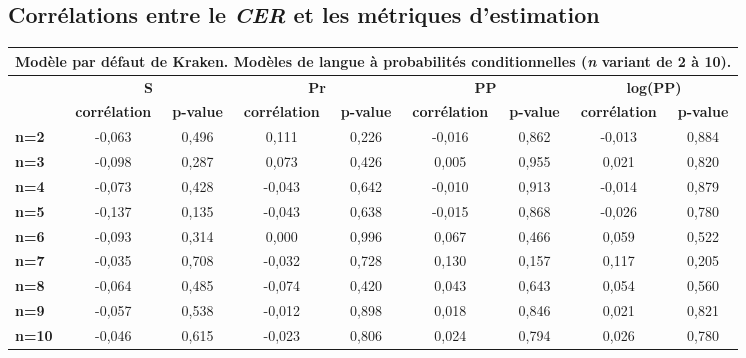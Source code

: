 \documentclass[10pt,twoside]{article}
\begin{document}
    \subsection{Corrélations entre le \textit{CER} et les métriques d'estimation}
    \begin{table}
    \begin{center}
    \begin{scriptsize}
    
    \begin{tabular}{|l|c|c|c|c|c|c|c|c|}  

    \multicolumn{9}{c}{{\footnotesize Modèle par défaut de Kraken. Modèles de langue à probabilités conditionnelles (\textit{n} variant de 2 à 10).}}\\\hline
    \multirow{2}{*}{\textbf{}} & \multicolumn{2}{c|}{\textbf{S}}         & \multicolumn{2}{c|}{\textbf{Pr}}        & \multicolumn{2}{c|}{\textbf{PP}}        & \multicolumn{2}{c|}{\textbf{log(PP)}}   \\ 
    \cline{2-9} & \textbf{corrélation} & \textbf{p-value} & \textbf{corrélation} & \textbf{p-value} & \textbf{corrélation} & \textbf{p-value} & \textbf{corrélation} & \textbf{p-value} \\ \hline
    
    \textbf{n=2}  & -0,063 & 0,496 & 0,111  & 0,226 & -0,016 & 0,862 & -0,013 & 0,884 \\ \hline
    \textbf{n=3}  & -0,098 & 0,287 & 0,073  & 0,426 & 0,005  & 0,955 & 0,021  & 0,820 \\ \hline
    \textbf{n=4}  & -0,073 & 0,428 & -0,043 & 0,642 & -0,010 & 0,913 & -0,014 & 0,879 \\ \hline
    \textbf{n=5}  & -0,137 & 0,135 & -0,043 & 0,638 & -0,015 & 0,868 & -0,026 & 0,780 \\ \hline
    \textbf{n=6}  & -0,093 & 0,314 & 0,000  & 0,996 & 0,067  & 0,466 & 0,059  & 0,522 \\ \hline
    \textbf{n=7}  & -0,035 & 0,708 & -0,032 & 0,728 & 0,130  & 0,157 & 0,117  & 0,205 \\ \hline
    \textbf{n=8}  & -0,064 & 0,485 & -0,074 & 0,420 & 0,043  & 0,643 & 0,054  & 0,560 \\ \hline
    \textbf{n=9}  & -0,057 & 0,538 & -0,012 & 0,898 & 0,018  & 0,846 & 0,021  & 0,821 \\ \hline
    \textbf{n=10} & -0,046 & 0,615 & -0,023 & 0,806 & 0,024  & 0,794 & 0,026  & 0,780 \\ \hline
    \end{tabular}


\end{scriptsize}
\end{center}
\end{table}
\end{document}
